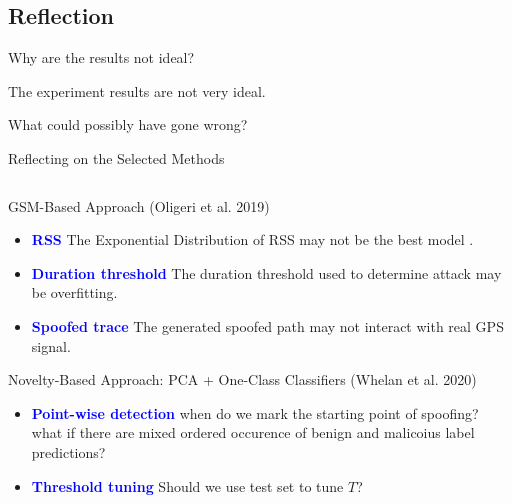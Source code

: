 \documentclass[aspectratio=169, 8pt]{beamer}
\begin{document}

\subsection{Reflection}

\begin{frame}{Why are the results not ideal?}

    \Huge{\centerline{The experiment results are not very ideal.}}
    \Huge{\centerline{What could possibly have gone wrong?}}
\end{frame}

\begin{frame}{Reflecting on the Selected Methods}


\begin{columns}[T]

    \begin{column}{0.5\linewidth}

        \begin{block}{GSM-Based Approach (Oligeri et al. 2019)}
        \begin{itemize}
            \item \textbf{\textcolor{blue}{RSS}} The Exponential Distribution of RSS may not be the best model .
            \item \textbf{\textcolor{blue}{Duration threshold}} The duration threshold used to determine attack may be overfitting.
            \item \textbf{\textcolor{blue}{Spoofed trace}} The generated spoofed path may not interact with real GPS signal.        
        \end{itemize}
        \end{block}
            


        \begin{block}{Novelty-Based Approach: PCA + One-Class Classifiers (Whelan et al. 2020)}
            \begin{itemize}
                \item \textbf{\textcolor{blue}{Point-wise detection}} when do we mark the starting point of spoofing? what if there are mixed ordered occurence of benign and malicoius label predictions? 
                \item \textbf{\textcolor{blue}{Threshold tuning}} Should we use test set to tune \(T\)?
            \end{itemize}
        \end{block}
    \end{column}
    

\end{columns}
\end{frame}
\end{document}
